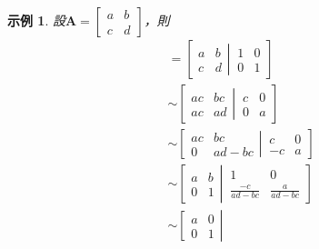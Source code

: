 \documentclass[12pt]{article}
\newtheorem*{example}{示例}
\begin{document}
    \begin{example}
        設$\mathbf{A}=\begin{bmatrix}
            a&b\\c&d
        \end{bmatrix}$，則\begin{align*}
            [\mathbf{A}|\mathbf{I}]&=\left[\begin{matrix}
                a&b\\
                c&d
            \end{matrix}\left|
            \, 
            \begin{matrix}
                1&0\\0&1
            \end{matrix}\right.\right]\\
            &\sim \left[\begin{matrix}
                ac&bc\\
                ac&ad
            \end{matrix}\left|
            \, 
            \begin{matrix}
                c&0\\0&a
            \end{matrix}\right.\right]\\
            &\sim \left[\begin{matrix}
                ac&bc\\
                0&ad-bc
            \end{matrix}\left|
            \, 
            \begin{matrix}
                c&0\\-c&a
            \end{matrix}\right.\right]\\
            &\sim \left[\begin{matrix}
                a&b\\
                0&1
            \end{matrix}\left|
            \, 
            \begin{matrix}
                1&0\\\frac{-c}{ad-bc}&\frac{a}{ad-bc}
            \end{matrix}\right.\right]\\
            &\sim \left[\begin{matrix}
                a&0\\
                0&1
            \end{matrix}\left|

\end{align*}
\end{example}
\end{document}
